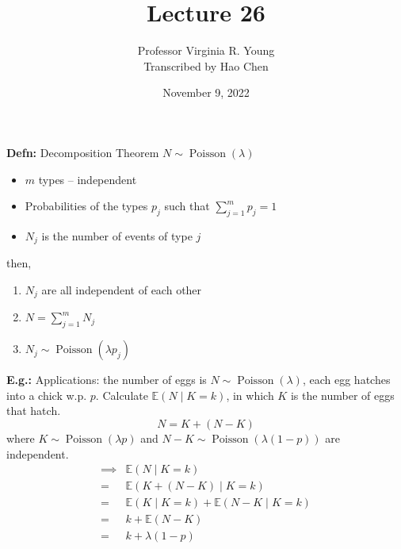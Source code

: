 \documentclass[a4paper]{article}
\title{Lecture 26}
\author{Professor Virginia R. Young\\ \small{Transcribed by Hao Chen}}
\date{November 9, 2022}
\newcommand{\n}{\hfill\break}
\newcommand{\defn}[1]{\par\noindent\settowidth{\hangindent}{\textbf{Defn: }}\textbf{Defn: }#1\n}
\newcommand{\eg}[1]{\par\noindent\settowidth{\hangindent}{\textbf{E.g.: }}\textbf{E.g.: }#1\n}
\newcommand{\Avg}{\mathbb{E}}
\newcommand{\E}{\Avg}
\DeclareMathOperator{\Poiss}{\text{Poisson}}
\begin{document}
\maketitle

\defn{
Decomposition Theorem $N\sim\Poiss(\lambda)$
\begin{itemize}
    \item $m$ types -- independent
    \item Probabilities of the types $p_j$ such that $\sum^m_{j=1} p_j=1$
    \item $N_j$ is the number of events of type $j$
\end{itemize}
then,
\begin{enumerate}
    \item $N_j$ are all independent of each other
    \item $N=\sum^m_{j=1} N_j$
    \item $N_j\sim\Poiss(\lambda p_j)$
\end{enumerate}
}

\eg{
    Applications: the number of eggs is $N\sim\Poiss(\lambda)$, each egg hatches into a chick w.p. $p$. Calculate $\E(N\mid K=k)$, in which $K$ is the number of eggs that hatch.
    \[N=K+(N-K)\]
    where $K\sim\Poiss(\lambda p)$ and $N-K\sim\Poiss(\lambda(1-p))$ are independent.
    \begin{align*}
        \implies&\E(N\mid K=k) \\
        =&\E(K+(N-K)\mid K=k) \\
        =&\E(K\mid K=k)+\E(N-K\mid K=k) \\
        =&k+\E(N-K) \\
        =&k+\lambda(1-p)
    \end{align*}
}
\end{document}

